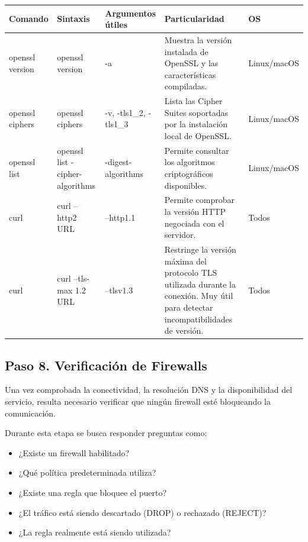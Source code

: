 \documentclass[a4paper,10pt]{article}
\begin{document}
\begin{longtable}{|p{2.8cm}|p{3cm}|p{4cm}|p{5.6cm}|p{1.5cm}|}

\hline
Comando &
Sintaxis &
Argumentos útiles &
Particularidad &
OS
\\
\hline
\endhead

openssl version &
openssl version &
-a &
Muestra la versión instalada de OpenSSL y las características compiladas. &
Linux/macOS
\\
\hline

openssl ciphers &
openssl ciphers &
-v, -tls1\_2, -tls1\_3 &
Lista las Cipher Suites soportadas por la instalación local de OpenSSL. &
Linux/macOS
\\
\hline

openssl list &
openssl list -cipher-algorithms &
-digest-algorithms &
Permite consultar los algoritmos criptográficos disponibles. &
Linux/macOS
\\
\hline

curl &
curl --http2 URL &
--http1.1 &
Permite comprobar la versión HTTP negociada con el servidor. &
Todos
\\
\hline

curl &
curl --tls-max 1.2 URL &
--tlsv1.3 &
Restringe la versión máxima del protocolo TLS utilizada durante la conexión. Muy útil para detectar incompatibilidades de versión. &
Todos
\\
\hline

\end{longtable}


\subsection{Paso 8. Verificación de Firewalls}

Una vez comprobada la conectividad, la resolución DNS y la disponibilidad del
servicio, resulta necesario verificar que ningún firewall esté bloqueando la
comunicación.

Durante esta etapa se busca responder preguntas como:

\begin{itemize}
\item ¿Existe un firewall habilitado?
\item ¿Qué política predeterminada utiliza?
\item ¿Existe una regla que bloquee el puerto?
\item ¿El tráfico está siendo descartado (DROP) o rechazado (REJECT)?
\item ¿La regla realmente está siendo utilizada?
\end{itemize}
\end{document}
